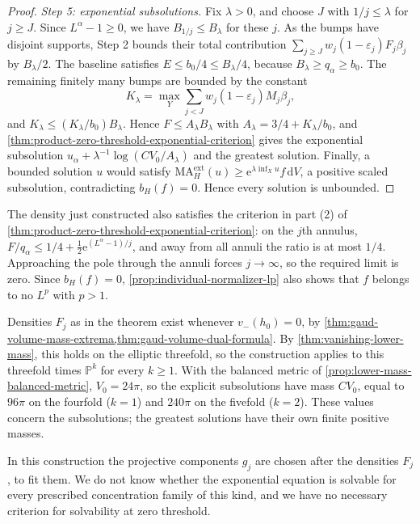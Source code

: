 \begin{proof}
\emph{Step 5: exponential subsolutions.} Fix $\lambda>0$, and choose $J$ with $1/j\leq\lambda$ for $j\geq J$. Since $L^\alpha-1\geq0$, we have $B_{1/j}\leq B_\lambda$ for these $j$. As the bumps have disjoint supports, Step 2 bounds their total contribution $\sum_{j\geq J}w_j(1-\varepsilon_j)F_j\beta_j$ by $B_\lambda/2$. The baseline satisfies $E\leq b_0/4\leq B_\lambda/4$, because $B_\lambda\geq q_\alpha\geq b_0$. The remaining finitely many bumps are bounded by the constant
\[
 K_\lambda=\max_Y\sum_{j<J}w_j(1-\varepsilon_j)M_j\beta_j,
\]
and $K_\lambda\leq(K_\lambda/b_0)B_\lambda$. Hence $F\leq A_\lambda B_\lambda$ with $A_\lambda=3/4+K_\lambda/b_0$, and \cref{thm:product-zero-threshold-exponential-criterion} gives the exponential subsolution $u_\alpha+\lambda^{-1}\log(CV_0/A_\lambda)$ and the greatest solution. Finally, a bounded solution $u$ would satisfy $\mathrm{MA}^{\mathrm{ext}}_H(u)\geq\mathrm{e}^{\lambda\inf_Xu}f\,\mathrm{d}V$, a positive scaled subsolution, contradicting $b_H(f)=0$. Hence every solution is unbounded.
\end{proof}

The density just constructed also satisfies the criterion in part (2) of \cref{thm:product-zero-threshold-exponential-criterion}: on the $j$th annulus, $F/q_\alpha\leq1/4+\frac12\mathrm e^{(L^\alpha-1)/j}$, and away from all annuli the ratio is at most $1/4$. Approaching the pole through the annuli forces $j\to\infty$, so the required limit is zero. Since $b_H(f)=0$, \cref{prop:individual-normalizer-lp} also shows that $f$ belongs to no $L^p$ with $p>1$.

Densities $F_j$ as in the theorem exist whenever $v_-(h_0)=0$, by \cref{thm:gaud-volume-mass-extrema,thm:gaud-volume-dual-formula}. By \cref{thm:vanishing-lower-mass}, this holds on the elliptic threefold, so the construction applies to this threefold times $\mathbb P^k$ for every $k\geq1$. With the balanced metric of \cref{prop:lower-mass-balanced-metric}, $V_0=24\pi$, so the explicit subsolutions have mass $CV_0$, equal to $96\pi$ on the fourfold ($k=1$) and $240\pi$ on the fivefold ($k=2$). These values concern the subsolutions; the greatest solutions have their own finite positive masses.

In this construction the projective components $g_j$ are chosen after the densities $F_j$, to fit them. We do not know whether the exponential equation is solvable for every prescribed concentration family of this kind, and we have no necessary criterion for solvability at zero threshold.

